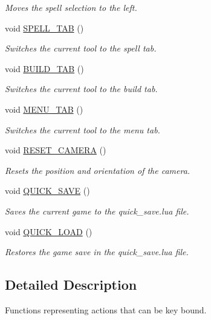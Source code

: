 \begin{DoxyCompactItemize}
\begin{DoxyCompactList}\small\item\em Moves the spell selection to the left. \end{DoxyCompactList}\item 
void \hyperlink{namespaceaction_ac08d5aabb24e92a6a5b8c2cce64815e9}{S\+P\+E\+L\+L\+\_\+\+T\+AB} ()
\begin{DoxyCompactList}\small\item\em Switches the current tool to the spell tab. \end{DoxyCompactList}\item 
void \hyperlink{namespaceaction_a2cf4dfb6dfb1ee0b4ffdfd2a2e3f07ab}{B\+U\+I\+L\+D\+\_\+\+T\+AB} ()
\begin{DoxyCompactList}\small\item\em Switches the current tool to the build tab. \end{DoxyCompactList}\item 
void \hyperlink{namespaceaction_aa1575dbb3cb6a55c71fc87ec7efffc5f}{M\+E\+N\+U\+\_\+\+T\+AB} ()
\begin{DoxyCompactList}\small\item\em Switches the current tool to the menu tab. \end{DoxyCompactList}\item 
void \hyperlink{namespaceaction_ad59d800694f2855c9e5ee0757472fee3}{R\+E\+S\+E\+T\+\_\+\+C\+A\+M\+E\+RA} ()
\begin{DoxyCompactList}\small\item\em Resets the position and orientation of the camera. \end{DoxyCompactList}\item 
void \hyperlink{namespaceaction_ab6aa4cc1659dd91123605d2127f02ca8}{Q\+U\+I\+C\+K\+\_\+\+S\+A\+VE} ()
\begin{DoxyCompactList}\small\item\em Saves the current game to the quick\+\_\+save.\+lua file. \end{DoxyCompactList}\item 
void \hyperlink{namespaceaction_ac987e23f82955c9fcbf4175563264c8f}{Q\+U\+I\+C\+K\+\_\+\+L\+O\+AD} ()
\begin{DoxyCompactList}\small\item\em Restores the game save in the quick\+\_\+save.\+lua file. \end{DoxyCompactList}\end{DoxyCompactItemize}


\subsection{Detailed Description}
Functions representing actions that can be key bound. 


